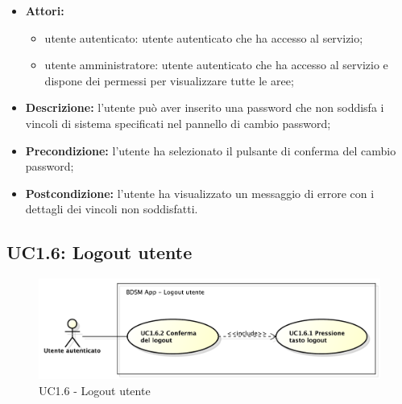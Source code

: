 \begin{itemize}
   	\item \textbf{Attori:}
    \begin{itemize}
    	\item utente autenticato: utente autenticato che ha accesso al servizio;
    	\item utente amministratore: utente autenticato che ha accesso al servizio e dispone dei permessi per visualizzare tutte le aree;
	\end{itemize}
    \item \textbf{Descrizione:} l'utente può aver inserito una password che non soddisfa i vincoli di sistema specificati nel pannello di cambio password;
    \item \textbf{Precondizione:} l'utente ha selezionato il pulsante di conferma del cambio password;
    \item \textbf{Postcondizione:} l'utente ha visualizzato un messaggio di errore con i dettagli dei vincoli non soddisfatti.
\end{itemize}

\pagebreak


\subsection{UC1.6: Logout utente}

\begin{figure}[htbp]
    \centering
    \centerline{\includegraphics[scale=0.45]{./images/UC1_6.pdf}}
    \caption{UC1.6 - Logout utente}
\end{figure}

